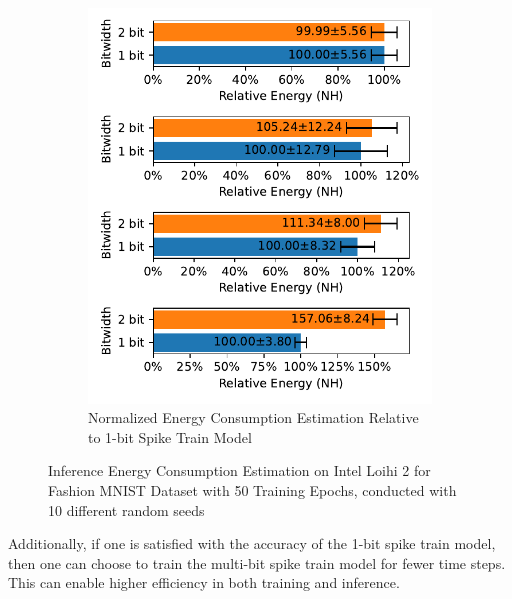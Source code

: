 \begin{figure}[!htpb]
\begin{subfigure}[H]{0.48\textwidth}
                \includegraphics[width=\textwidth]{../firerate/FashionMNIST/plots/fashionmnist_test_relative_energy_nh.pdf}
                \caption{Normalized Energy Consumption Estimation Relative to 1-bit Spike Train Model}
            \end{subfigure}
            \caption{Inference Energy Consumption Estimation on Intel Loihi 2 for Fashion MNIST Dataset with 50 Training Epochs, conducted with 10 different random seeds}
            \label{fig:inference_energy_nh_firerate}
        \end{figure}

        Additionally, if one is satisfied with the accuracy of the 1-bit spike train model, then one can choose to train the multi-bit spike train model for fewer time steps. This can enable higher efficiency in both training and inference. 

